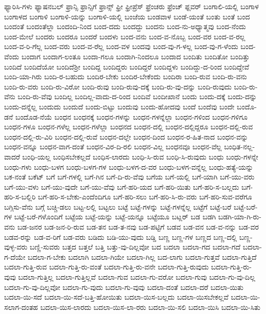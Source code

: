 {ಫ್ಯಾರಿಸಿ-ಗಳು
ಫ್ಯಾಷನಬಲ್
ಫ್ರಾನ್ಸಿ
ಫ್ರಾನ್ಸಿಗೆ
ಫ್ರಾನ್ಸ್
ಫ್ರೀ
ಫ್ರೀಪ್ರೆಸ್
ಫ್ರೆಂಚರು
ಫ್ರೆಂಚ್
ಫ್ಲವರ್
ಬಂಗಾಲಿ-ಯಲ್ಲಿ
ಬಂಗಾಳ
ಬಂಗಾಳದ
ಬಂಗಾಳಿ
ಬಂಗಾಳಿ-ಯನ್ನು
ಬಂಗಾಳಿ-ಯಲ್ಲಿ
ಬಂಜೆಯ
ಬಂಡವಾಳ
ಬಂಡೆ-ಯಂತೆ
ಬಂತು
ಬಂತೆ
ಬಂದ
ಬಂದಂತೆ
ಬಂದಂತೆಲ್ಲಾ
ಬಂದಂದಿ-ನಿಂದ
ಬಂದ-ದದು
ಬಂದದ್ದು
ಬಂದನು
ಬಂದ-ನು-ಅಧ್ಯಾತ್ಮವು
ಬಂದ-ನೆಂದು
ಬಂದ-ಮೇಲೆ
ಬಂದರು
ಬಂದರೂ
ಬಂದರೆ
ಬಂದಳು
ಬಂದ-ವನು
ಬಂದ-ವ-ನೊಬ್ಬ
ಬಂದ-ವರ
ಬಂದ-ವ-ರಲ್ಲ
ಬಂದ-ವ-ರಿ-ಗೆಲ್ಲ
ಬಂದ-ವರು
ಬಂದ-ವ-ರೆಲ್ಲ
ಬಂದ-ವಳ
ಬಂದವು
ಬಂದ-ವು-ಗ-ಳಲ್ಲ
ಬಂದ-ವು-ಗ-ಳೆಂದು
ಬಂದ-ವೆಂದು
ಬಂದಾಗ
ಬಂದಾಗ-ಲಂತೂ
ಬಂದಾ-ಗಲೂ
ಬಂದಾಗಿ-ನಿಂದಲೂ
ಬಂದಾದ
ಬಂದಿತು
ಬಂದಿತೋ
ಬಂದಿತ್ತು
ಬಂದಿದೆ
ಬಂದಿದೆಯೋ
ಬಂದಿದೆಶ್ರೀ
ಬಂದಿದ್ದ
ಬಂದಿದ್ದರು
ಬಂದಿದ್ದರೆ
ಬಂದಿದ್ದಳು
ಬಂದಿದ್ದು-ದ-ರಿಂದ
ಬಂದಿದ್ದೇವೆ
ಬಂದಿ-ಯಾ-ಗಿರು
ಬಂದಿ-ರ-ಬಹುದು
ಬಂದಿರ-ಬೇಕು
ಬಂದಿರ-ಬೇಕೆಂದು
ಬಂದಿರಾ
ಬಂದಿ-ರುವ
ಬಂದಿ-ರು-ವನು
ಬಂದಿ-ರು-ವರು
ಬಂದಿ-ರು-ವಿರೋ
ಬಂದಿ-ರುವು
ಬಂದಿ-ರುವು-ದಕ್ಕೆ
ಬಂದಿ-ರು-ವು-ದನ್ನು
ಬಂದಿ-ರುವುದು
ಬಂದಿ-ರು-ವೆನು
ಬಂದಿ-ರು-ವೆವು
ಬಂದಿಲ್ಲ
ಬಂದಿಲ್ಲ-ವಾದು-ದ-ರಿಂದ
ಬಂದಿವೆ
ಬಂದೀಖಾನೆ
ಬಂದು
ಬಂದು-ದಕ್ಕೆ
ಬಂದು-ದನ್ನು
ಬಂದು-ದನ್ನೆಲ್ಲ
ಬಂದುದು
ಬಂದುದೆ
ಬಂದು-ಬಿಟ್ಟು
ಬಂದುವು
ಬಂದು-ಹೋದವು
ಬಂದೆ
ಬಂದೆವು
ಬಂದೇ
ಬಂದೊ-ಡನೆ
ಬಂದೊಡ-ನೆಯೆ
ಬಂಧನ
ಬಂಧನಕ್ಕೆ
ಬಂಧನ-ಗಳನ್ನು
ಬಂಧನ-ಗಳನ್ನೆಲ್ಲಾ
ಬಂಧನ-ಗಳಿಂದ
ಬಂಧನ-ಗಳಿಗೂ
ಬಂಧನ-ಗಳೂ
ಬಂಧನ-ಗಳೆಲ್ಲ
ಬಂಧನ-ಗಳೆಲ್ಲಾ
ಬಂಧನದ
ಬಂಧನ-ದಲ್ಲಿ
ಬಂಧನ-ದಲ್ಲಿದ್ದರೂ
ಬಂಧನ-ದಲ್ಲಿ-ರುವ
ಬಂಧನ-ದಲ್ಲಿ-ರು-ವಿರಿ
ಬಂಧನ-ದಲ್ಲಿ-ರುವೆ
ಬಂಧನ-ದಲ್ಲೇ
ಬಂಧನ-ದಿಂದ
ಬಂಧನ-ರ-ಹಿತ-ನಾದ
ಬಂಧನ-ವನ್ನು
ಬಂಧನ-ವನ್ನೂ
ಬಂಧನ-ವಾಗ-ದಂತೆ
ಬಂಧನ-ವಿರ-ದಿ-ರಲಿ
ಬಂಧನ-ವಿಲ್ಲ
ಬಂಧನವೂ
ಬಂಧನ-ವೆಲ್ಲ
ಬಂಧಿತ-ನಲ್ಲ-ವಾದರೆ
ಬಂಧಿ-ಯಲ್ಲ
ಬಂಧಿಸಬೇಕಲ್ಲದೆ
ಬಂಧಿಸ-ಲಾರದು
ಬಂಧಿ-ಸಿ-ರುವ
ಬಂಧಿ-ಸಿ-ರುವುದು
ಬಂಧು
ಬಂಧು-ಗಳನ್ನೇ
ಬಂಧು-ಗಳು
ಬಂಧು-ಬಳಗ
ಬಂಧು-ಬಳಗ-ಗಳ
ಬಂಧು-ಬಳಗ-ದ-ವರ
ಬಂಧು-ಬಳಗ-ವನ್ನೆಲ್ಲ
ಬಂಧು-ಹತ್ಯೆ-ಯನ್ನು
ಬಕ-ನಂತೆ
ಬಕೆಟ್
ಬಗೆ
ಬಗೆ-ಗಳಲ್ಲಿ
ಬಗೆ-ಗಿನ
ಬಗೆ-ದಿ-ರು-ವೆವು
ಬಗೆಯ
ಬಗೆ-ಯಲ್ಲಿ
ಬಗೆ-ಯಾಗಿ
ಬಗೆ-ಯು-ವರು
ಬಗೆ-ಯು-ವಳು
ಬಗೆ-ಯು-ವುದೇ
ಬಗೆ-ಯು-ವೆವು
ಬಗೆ-ಹರಿ-ಯದ
ಬಗೆ-ಹರಿ-ಯಿತು
ಬಗೆ-ಹರಿ-ಸ-ಬಲ್ಲದು
ಬಗೆ-ಹರಿ-ಸ-ಬಲ್ಲಿರಿ
ಬಗೆ-ಹರಿ-ಸ-ಬೇಕು-ಎಂದೆಂದಿಗೂ
ಬಗೆ-ಹರಿ-ಸಲು
ಬಗೆ-ಹರಿ-ಸಿ-ರು-ವರು
ಬಗೆ-ಹರಿ-ಸುವ-ವರೆಗೂ
ಬಗ್ಗಿಸು-ವೆನು
ಬಗ್ಗೆ
ಬಚ್ಚಿ-ಡಲು
ಬಟ್ಟ-ಲಲ್ಲಿ
ಬಟ್ಟಲು
ಬಟ್ಟೆ
ಬಟ್ಟೆ-ಗಳನ್ನು
ಬಟ್ಟೆ-ಗಳನ್ನೆಲ್ಲ
ಬಟ್ಟೆಗೆ
ಬಟ್ಟೆ-ಬರೆ
ಬಟ್ಟೆ-ಬರೆ-ಗಳ
ಬಟ್ಟೆ-ಬರೆ-ಗಳೊಂದಿಗೆ
ಬಟ್ಟೆಯ
ಬಟ್ಟೆ-ಯನ್ನು
ಬಟ್ಟೆ-ಯನ್ನೂ
ಬಟ್ಟೆಯೂ
ಬಟ್ಲರ್
ಬಡ
ಬಡಗಿ
ಬಡಗಿ-ಯಾ-ಗಿ-ರು-ವನು
ಬಡ-ಜನರ
ಬಡ-ಜನ-ರಿ-ರುವ
ಬಡ-ತನ
ಬಡ-ತ-ನವು
ಬಡ-ಪಟ್ಟಿಗೆ
ಬಡವ
ಬಡ-ವನ
ಬಡ-ವ-ನನ್ನು
ಬಡ-ವರ
ಬಡವ-ರನ್ನು
ಬಡ-ವ-ರಿಗೆ
ಬಡ-ವರು
ಬಡಿದು
ಬಡಿ-ಯು-ವುದು
ಬಡ್ಡಿ
ಬಣ್ಣ
ಬಣ್ಣ-ಗಳ
ಬಣ್ಣದ
ಬಣ್ಣ-ದಲ್ಲಿ
ಬಣ್ಣ-ವುಳ್ಳ-ವರು
ಬಣ್ಣಿ-ಸುವರು
ಬತ್ತದ
ಬತ್ತಲೆ
ಬತ್ತಿ
ಬತ್ತು-ವು-ದಿಲ್ಲವೋ
ಬದ
ಬದಲಾ
ಬದಲಾ-ಗದ
ಬದಲಾ-ಗದೆ
ಬದಲಾ-ಗ-ದೆಯೇ
ಬದಲಾ-ಗ-ಬೇಕು
ಬದಲಾಗಿ
ಬದಲಾ-ಗಿಯೇ
ಬದಲಾ-ಗಿಲ್ಲ
ಬದ-ಲಾಗು
ಬದಲಾ-ಗುತ್ತವೆ
ಬದಲಾ-ಗುತ್ತಿದೆ
ಬದಲಾ-ಗುತ್ತಿ-ರುವ
ಬದಲಾ-ಗುತ್ತಿ-ರು-ವಂತೆ
ಬದಲಾ-ಗುತ್ತಿ-ರು-ವನೇ
ಬದಲಾ-ಗುತ್ತಿ-ರುವುದು
ಬದಲಾ-ಗುತ್ತಿ-ರು-ವುವು
ಬದಲಾ-ಗುತ್ತಿಲ್ಲ
ಬದಲಾ-ಗುತ್ತಿಲ್ಲವೆ
ಬದಲಾ-ಗುವ
ಬದಲಾ-ಗು-ವರೋ
ಬದಲಾ-ಗುವು
ಬದಲಾ-ಗು-ವು-ದಿಲ್ಲ
ಬದಲಾ-ಗು-ವು-ದಿಲ್ಲವೋ
ಬದಲಾ-ಗು-ವುದು
ಬದಲಾ-ಗು-ವುವು
ಬದಲಾ-ದಂತೆ
ಬದಲಾ-ದರೆ
ಬದಲಾ-ಯಿತು
ಬದಲಾ-ಯಿ-ಸದೆ
ಬದಲಾ-ಯಿ-ಸದೆ-ಬತ್ತಿ-ಹೋಯಿತು
ಬದಲಾ-ಯಿಸ-ಬಲ್ಲದು
ಬದಲಾ-ಯಿಸಬೇಕಲ್ಲವೆ
ಬದಲಾ-ಯಿ-ಸಲಾಗ-ದಂತಹ
ಬದಲಾ-ಯಿಸ-ಲಾರದು
ಬದಲಾ-ಯಿಸ-ಲಾ-ರರು
ಬದಲಾ-ಯಿ-ಸಲಿ
ಬದಲಾ-ಯಿಸಿ
ಬದಲಾ-ಯಿ-ಸಿತು
}
